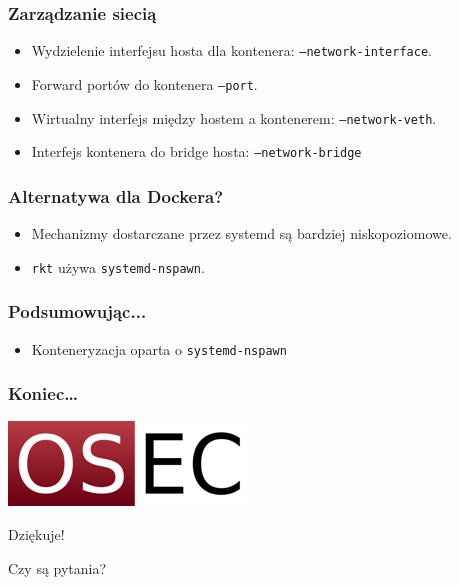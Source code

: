 \documentclass[dvipsnames,table]{beamer}
\begin{document}
\begin{frame}
\frametitle{Zarządzanie siecią}
\begin{itemize}
	\item Wydzielenie interfejsu hosta dla kontenera: {\tt --network-interface}.
	\item Forward portów do kontenera {\tt --port}.
	\item Wirtualny interfejs między hostem a kontenerem: {\tt --network-veth}.
	\item Interfejs kontenera do bridge hosta: {\tt --network-bridge}
\end{itemize}
\end{frame}

\begin{frame}
\frametitle{Alternatywa dla Dockera?}
\begin{itemize}
	\item Mechanizmy dostarczane przez systemd są bardziej niskopoziomowe.
	\item {\tt rkt} używa {\tt systemd-nspawn}.
\end{itemize}	
\end{frame}

\begin{frame}
\frametitle{Podsumowując...}
\begin{itemize}
	\item Konteneryzacja oparta o {\tt systemd-nspawn} 
\end{itemize}
\end{frame}

\begin{frame}
\frametitle{Koniec\ldots}
\begin{center}
\includegraphics[scale=0.5]{img-oseclogo.png}

Dziękuje!

Czy są pytania?

\end{center}
\end{frame}
\end{document}
